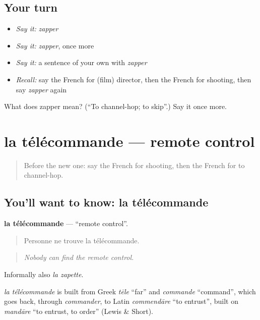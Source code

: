 \subsection*{Your turn}
\begin{itemize}
\raggedright
  \item \emph{Say it:} \emph{zapper}
  \item \emph{Say it:} \emph{zapper}, once more
  \item \emph{Say it:} a sentence of your own with \emph{zapper}
  \item \emph{Recall:} say the French for (film) director, then the French for shooting, then say \emph{zapper} again
\end{itemize}

\begin{tcolorbox}[breakable,colback=teal!4,colframe=teal!35!black,title={Before you move on}]
What does zapper mean? (\textquotedblleft{}To channel-hop; to skip\textquotedblright{}.) Say it once more.
\end{tcolorbox}
\section[la télécommande]{la télécommande — remote control}

\label{lesson:FR-C525-telecommande}



\begin{quote}
Before the new one: say the French for shooting, then the French for to channel-hop.
\end{quote}

\subsection*{You'll want to know: la télécommande}
\textbf{la télécommande} — \textquotedblleft{}remote control\textquotedblright{}.

\begin{quote}
Personne ne trouve la télécommande.
\end{quote}

\begin{quote}
\emph{Nobody can find the remote control.}
\end{quote}

Informally also \emph{la zapette}.

\begin{cousinweb}
\emph{la télécommande} is built from Greek \emph{tēle} \textquotedblleft{}far\textquotedblright{} and \emph{commande} \textquotedblleft{}command\textquotedblright{}, which goes back, through \emph{commander}, to Latin \emph{commendāre} \textquotedblleft{}to entrust\textquotedblright{}, built on \emph{mandāre} \textquotedblleft{}to entrust, to order\textquotedblright{} (Lewis \& Short).
\end{cousinweb}

